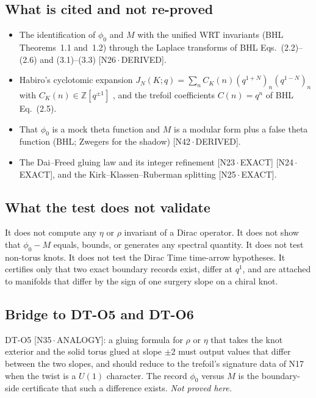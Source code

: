 \documentclass[11pt]{article}
\theoremstyle{definition}
\newcommand{\dtag}[1]{#1}
\begin{document}
\subsection{What is cited and not re-proved}
\begin{itemize}[leftmargin=2em]
\item The identification of $\phi_0$ and $M$ with the unified WRT invariants (BHL Theorems~1.1 and~1.2) through the Laplace transforms of BHL Eqs.~(2.2)--(2.6) and (3.1)--(3.3) \dtag{\textsf{\small[N26\,$\cdot$\,DERIVED]}}.
\item Habiro's cyclotomic expansion $J_N(K;q)=\sum_n C_K(n)(q^{1+N})_n(q^{1-N})_n$ with $C_K(n)\in\mathbb Z[q^{\pm1}]$ \cite{Habiro}, and the trefoil coefficients $C(n)=q^n$ of BHL Eq.~(2.5).
\item That $\phi_0$ is a mock theta function and $M$ is a modular form plus a false theta function (BHL; Zwegers \cite{Zwegers} for the shadow) \dtag{\textsf{\small[N42\,$\cdot$\,DERIVED]}}.
\item The Dai--Freed gluing law and its integer refinement \cite{DaiFreed,KirkLesch} \dtag{\textsf{\small[N23\,$\cdot$\,EXACT]} \textsf{\small[N24\,$\cdot$\,EXACT]}}, and the Kirk--Klassen--Ruberman splitting \cite{KKR} \dtag{\textsf{\small[N25\,$\cdot$\,EXACT]}}.
\end{itemize}

\subsection{What the test does not validate}
It does not compute any $\eta$ or $\rho$ invariant of a Dirac operator. It does not show that $\phi_0-M$ equals, bounds, or generates any spectral quantity. It does not test non-torus knots. It does not test the Dirac Time time-arrow hypotheses. It certifies only that two exact boundary records exist, differ at $q^1$, and are attached to manifolds that differ by the sign of one surgery slope on a chiral knot.

\subsection{Bridge to DT-O5 and DT-O6}
DT-O5 \dtag{\textsf{\small[N35\,$\cdot$\,ANALOGY]}}: a gluing formula for $\rho$ or $\eta$ that takes the knot exterior and the solid torus glued at slope $\pm2$ must output values that differ between the two slopes, and should reduce to the trefoil's signature data of N17 when the twist is a $U(1)$ character. The record $\phi_0$ versus $M$ is the boundary-side certificate that such a difference exists. \emph{Not proved here.}
\end{document}
